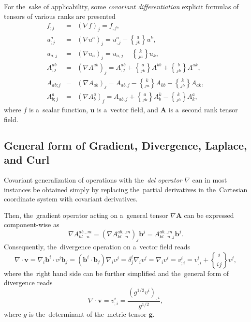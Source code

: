 \documentclass[preprint,12pt]{elsarticle}
\newcommand{\vect}[1]{\boldsymbol{#1}}
\newcommand{\matr}[1]{\mathbf{#1}}
\newcommand{\christ}[3]{\genfrac{\{}{\}}{0pt}{}{#1}{#2 #3}}
\newcounter{bla}
\begin{document}
For the~sake of applicability, some \textit{covariant differentiation}
explicit formulas of tensors of various ranks are presented
\begin{eqnarray}
  f_{;j} &=& (\nabla f)_j = f_{,j} , \label{eq:cd_scalar}\\
  u^a_{;j} &=& (\nabla u^a)_j = u^a_{,j} + \christ{a}{j}{k} u^k , 
  \label{eq:cd_contravector} \\
  u_{a;j} &=& (\nabla u_a)_j = u_{a,j} - \christ{k}{j}{a} u_k , 
  \label{eq:cd_covector} \\
  A^{ab}_{;j} &=& (\nabla A^{ab})_j = A^{ab}_{,j} + \christ{a}{j}{k} A^{kb} 
  + \christ{b}{j}{k} A^{ak} , 
  \label{eq:cd_contratensor} \\
  A_{ab;j} &=& (\nabla A_{ab})_j = A_{ab,j} - \christ{k}{j}{a} A_{kb} 
  - \christ{k}{j}{b} A_{ak} ,
  \label{eq:cd_cotensor} \\
  A^a_{b;j} &=& (\nabla A^a_{b})_j = A_{ab,j} + \christ{a}{j}{k} A^k_b
  - \christ{k}{j}{b} A^a_k ,
  \label{eq:cd_mixedtensor}
\end{eqnarray} 
where $f$ is a~scalar function, $\vect{u}$ is a~vector field, and
$\matr{A}$ is a~second rank tensor field.

\subsection{General form of Gradient, Divergence, Laplace, and Curl}
Covariant generalization of operations with the~\textit{del operator} $\nabla$
can in most instances be obtained simply by replacing the~partial derivatives
in the~Cartesian coordinate system with covariant derivatives.

Then, the~gradient operator acting on a~general tensor $\nabla \matr{A}$ can
be expressed component-wise as
\begin{equation}
  \nabla A^{ab...m}_{kl...n} = (\nabla A^{ab...m}_{kl...n})_j\vect{b}^j 
  = A^{ab...m}_{kl...n;j}\vect{b}^j .
  \label{eq:general_grad}
\end{equation}
Consequently, the~divergence operation on a~vector field reads
\begin{equation}
  \nabla\cdot\vect{v} = \nabla_i\vect{b}^i\cdot v^j\vect{b}_j 
  = (\vect{b}^i\cdot\vect{b}_j) \nabla_i v^j = \delta^i_j \nabla_i v^j
  = \nabla_i v^i = v^i_{;i} = v^i_{,i} + \christ{i}{i}{j}v^j ,
  \nonumber
\end{equation}
where the~right hand side can be further simplified and the~general form
of divergence reads
\begin{equation}
  \nabla\cdot\vect{v} = v^i_{;i} = \frac{(g^{1/2}v^i)_{,i}}{g^{1/2}} ,
  \label{eq:general_divvec}
\end{equation}
where $g$ is the~determinant of the~metric tensor $\matr{g}$.
\end{document}
